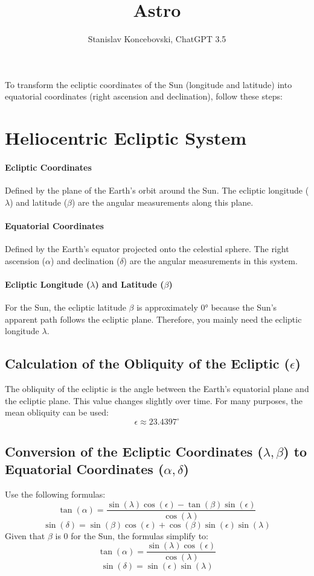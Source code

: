 \documentclass[12pt,a4paper]{article}
\author{Stanislav Koncebovski, ChatGPT 3.5}
\title{Astro}
\begin{document}
	\maketitle
	
	To transform the ecliptic coordinates of the Sun (longitude and latitude) into equatorial coordinates (right ascension and declination), follow these steps:
	
	\section{Heliocentric Ecliptic System}
		\paragraph{Ecliptic Coordinates}
			Defined by the plane of the Earth's orbit around the Sun. The ecliptic longitude (\(\lambda\)) and latitude (\(\beta\)) are the angular measurements along this plane.
		\paragraph{Equatorial Coordinates}
			Defined by the Earth's equator projected onto the celestial sphere. The right ascension (\(\alpha\)) and declination (\(\delta\)) are the angular measurements in this system.
	
	\paragraph{Ecliptic Longitude (\(\lambda\)) and Latitude (\(\beta\))}
		For the Sun, the ecliptic latitude \(\beta\) is approximately 0° because the Sun's apparent path follows the ecliptic plane. Therefore, you mainly need the ecliptic longitude \(\lambda\).
	
	\subsection{Calculation of the Obliquity of the Ecliptic (\(\epsilon\))}
		The obliquity of the ecliptic is the angle between the Earth's equatorial plane and the ecliptic plane. This value changes slightly over time. For many purposes, the mean obliquity can be used:
	\[
	\epsilon \approx 23.4397^\circ
	\]
	
	\subsection{Conversion of the Ecliptic Coordinates (\(\lambda, \beta\)) to Equatorial Coordinates (\(\alpha, \delta\))}
		Use the following formulas:
	\[
	\tan(\alpha) = \frac{\sin(\lambda) \cos(\epsilon) - \tan(\beta) \sin(\epsilon)}{\cos(\lambda)}
	\]
	\[
	\sin(\delta) = \sin(\beta) \cos(\epsilon) + \cos(\beta) \sin(\epsilon) \sin(\lambda)
	\]
	Given that \(\beta\) is 0 for the Sun, the formulas simplify to:
	\[
	\tan(\alpha) = \frac{\sin(\lambda) \cos(\epsilon)}{\cos(\lambda)}
	\]
	\[
	\sin(\delta) = \sin(\epsilon) \sin(\lambda)
	\]
	
\end{document}
